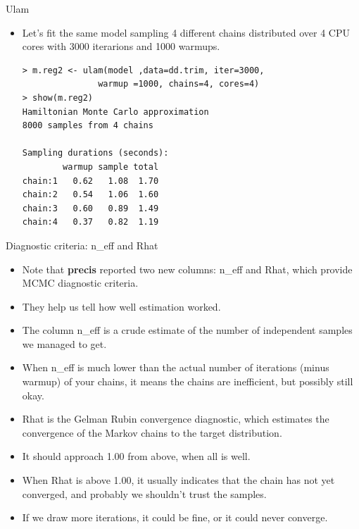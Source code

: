\documentclass[handout]{beamer}
\begin{document}
\begin{frame}[fragile]{Ulam}
\scriptsize{


\begin{itemize}


\item Let's fit the same model sampling 4 different chains distributed over 4 CPU cores with 3000 iterarions and 1000  warmups.

\begin{verbatim}
> m.reg2 <- ulam(model ,data=dd.trim, iter=3000, 
               warmup =1000, chains=4, cores=4) 
> show(m.reg2)
Hamiltonian Monte Carlo approximation
8000 samples from 4 chains

Sampling durations (seconds):
        warmup sample total
chain:1   0.62   1.08  1.70
chain:2   0.54   1.06  1.60
chain:3   0.60   0.89  1.49
chain:4   0.37   0.82  1.19

\end{verbatim}


 \end{itemize}




} 
\end{frame}



\begin{frame}[fragile]{Diagnostic criteria: n\_eff and Rhat }
\scriptsize{

\begin{itemize}

\item Note that \textbf{precis} reported two new columns: n\_eff and Rhat, which provide MCMC diagnostic criteria.

\item They help us tell how well estimation worked. 

\item The column n\_eff is a crude estimate of the number of independent samples we managed to get.

\item When n\_eff is much lower than the actual number of iterations
(minus warmup) of your chains, it means the chains are inefficient, but possibly still okay.

\item Rhat  is the Gelman Rubin convergence diagnostic, which estimates  the convergence of the Markov chains to the target distribution.

\item It should approach 1.00 from above, when all is well.

\item When Rhat is above 1.00, it usually indicates that the chain has not yet converged, and probably we shouldn't trust the samples.

\item If we draw more iterations, it could be fine, or it could never converge.


 \end{itemize}







} 
\end{frame}
\end{document}

